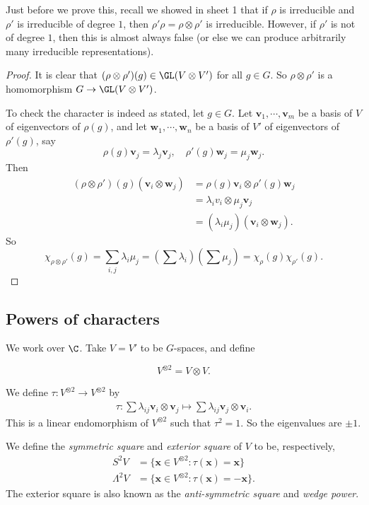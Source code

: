 \documentclass[a4paper]{article}
\begin{document}
Just before we prove this, recall we showed in sheet 1 that if $\rho$ is irreducible and $\rho'$ is irreducible of degree $1$, then $\rho' \rho = \rho \otimes \rho'$ is irreducible. However, if $\rho'$ is not of degree $1$, then this is almost always false (or else we can produce arbitrarily many irreducible representations).

\begin{proof}
  It is clear that $(\rho \otimes \rho')(g) \in \GL(V \otimes V')$ for all $g \in G$. So $\rho \otimes \rho'$ is a homomorphism $G \to \GL(V \otimes V')$.

  To check the character is indeed as stated, let $g \in G$. Let $\mathbf{v}_1, \cdots, \mathbf{v}_m$ be a basis of $V$ of eigenvectors of $\rho(g)$, and let $\mathbf{w}_1, \cdots, \mathbf{w}_n$ be a basis of $V'$ of eigenvectors of $\rho'(g)$, say
  \[
    \rho(g) \mathbf{v}_j = \lambda_j \mathbf{v}_j,\quad \rho'(g) \mathbf{w}_j = \mu_j \mathbf{w}_j.
  \]
  Then
  \begin{align*}
    (\rho\otimes \rho')(g)(\mathbf{v}_i \otimes \mathbf{w}_j) &= \rho(g) \mathbf{v}_i \otimes \rho'(g) \mathbf{w}_j\\
    &= \lambda_i v_i \otimes \mu_j \mathbf{v}_j\\
    &= (\lambda_i \mu_j) (\mathbf{v}_i \otimes \mathbf{w}_j).
  \end{align*}
  So
  \[
    \chi_{\rho\otimes \rho'}(g) = \sum_{i, j} \lambda_i \mu_j = \left(\sum \lambda_i\right)\left(\sum \mu_j\right) = \chi_\rho(g) \chi_{\rho'}(g).
  \]
\end{proof}
\subsection{Powers of characters}
We work over $\C$. Take $V = V'$ to be $G$-spaces, and define
\begin{notation}
  \[
    V^{\otimes 2} = V\otimes V.
  \]
\end{notation}
We define $\tau: V^{\otimes 2} \to V^{\otimes 2}$ by
\begin{align*}
  \tau: \sum \lambda_{ij} \mathbf{v}_i \otimes \mathbf{v}_j \mapsto \sum \lambda_{ij} \mathbf{v}_j \otimes \mathbf{v}_i.
\end{align*}
This is a linear endomorphism of $V^{\otimes 2}$ such that $\tau^2 = 1$. So the eigenvalues are $\pm 1$.

\begin{defi}
  We define the \emph{symmetric square} and \emph{exterior square} of $V$ to be, respectively,
  \begin{align*}
    S^2 V &= \{\mathbf{x} \in V^{\otimes 2}: \tau(\mathbf{x}) = \mathbf{x}\}\\
    \Lambda^2 V &= \{\mathbf{x} \in V^{\otimes 2}: \tau(\mathbf{x}) = -\mathbf{x}\}.
  \end{align*}
  The exterior square is also known as the \emph{anti-symmetric square} and \emph{wedge power}.
\end{defi}
\end{document}
